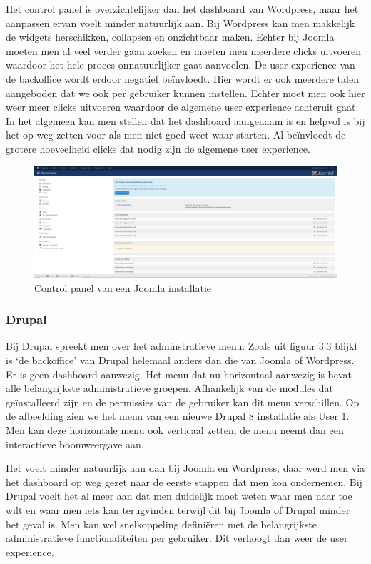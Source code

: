 Het control panel is overzichtelijker dan het dashboard van Wordpress, maar het aanpassen ervan voelt minder natuurlijk aan. Bij Wordpress kan men makkelijk de widgets herschikken, collapsen en onzichtbaar maken. Echter bij Joomla moeten men al veel verder gaan zoeken en moeten men meerdere clicks uitvoeren waardoor het hele proces onnatuurlijker gaat aanvoelen. De user experience van de backoffice wordt erdoor negatief beïnvloedt. Hier wordt er ook meerdere talen aangeboden dat we ook per gebruiker kunnen instellen. Echter moet men ook hier weer meer clicks uitvoeren waardoor de algemene user experience achteruit gaat. In het algemeen kan men stellen dat het dashboard aangenaam is en helpvol is bij het op weg zetten voor als men niet goed weet waar starten. Al beïnvloedt de grotere hoeveelheid clicks dat nodig zijn de algemene user experience.

\begin{figure}
    \centering
    \includegraphics[scale = 0.2]{img/Joomla_controlPanel.png}
    \caption{Control panel van een Joomla installatie}
    \label{fig:controlPanelJoomla}
\end{figure}
\subsubsection{Drupal}
Bij Drupal spreekt men over het adminstratieve menu. Zoals uit figuur 3.3 blijkt is `de backoffice' van Drupal helemaal anders dan die van Joomla of Wordpress. Er is geen dashboard aanwezig. Het menu dat nu horizontaal aanwezig is bevat alle belangrijkste administratieve groepen. Afhankelijk van de modules dat geïnstalleerd zijn en de permissies van de gebruiker kan dit menu verschillen. Op de afbeelding zien we het menu van een nieuwe Drupal 8 installatie als User 1. Men kan deze horizontale menu ook verticaal zetten, de menu neemt dan een interactieve boomweergave aan.

Het voelt minder natuurlijk aan dan bij Joomla en Wordpress, daar werd men via het dashboard op weg gezet naar de eerste stappen dat men kon ondernemen. Bij Drupal voelt het al meer aan dat men duidelijk moet weten waar men naar toe wilt en waar men iets kan terugvinden terwijl dit bij Joomla of Drupal minder het geval is. Men kan wel snelkoppeling definiëren met de belangrijkste administratieve functionaliteiten per gebruiker. Dit verhoogt dan weer de user experience.

